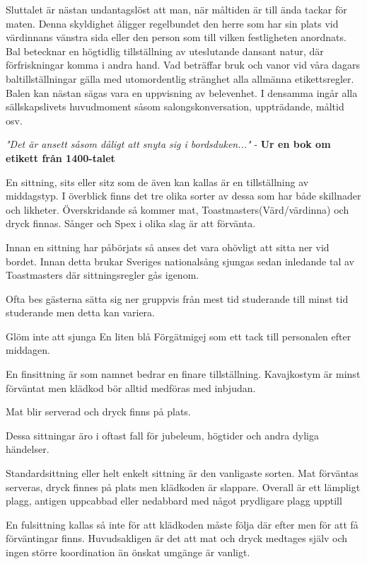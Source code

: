 Sluttalet är nästan undantagslöst att man, när måltiden är till ända tackar för maten. Denna skyldighet åligger regelbundet den herre som har sin plats vid värdinnans vänstra sida eller den person som till vilken festligheten anordnats.
\filbreak
{}
Bal betecknar en högtidlig tillställning av uteslutande dansant natur, där förfriskningar komma i andra hand. Vad beträffar bruk och vanor vid våra dagars baltillställningar gälla med utomordentlig stränghet alla allmänna etikettsregler. Balen kan nästan sägas vara en uppvisning av belevenhet. I densamma ingår alla sällskapslivets huvudmoment såsom salongskonversation, uppträdande, måltid osv.

\textit{"Det är ansett såsom dåligt att snyta sig i bordsduken..."} - \textbf{Ur en bok om etikett från 1400-talet}
\filbreak
{}

En sittning, sits eller sitz som de även kan kallas är en tillställning av middagstyp. I överblick finns det tre olika sorter av dessa som har både skillnader och likheter. Överskridande så kommer mat, Toastmasters(Värd/värdinna) och dryck finnas. Sånger och Spex i olika slag är att förvänta.

Innan en sittning har påbörjats så anses det vara ohövligt att sitta ner vid bordet. Innan detta brukar Sveriges nationalsång sjungas sedan inledande tal av Toastmasters där sittningsregler gås igenom.

Ofta bes gästerna sätta sig ner gruppvis från mest tid studerande till minst tid studerande men detta kan variera.

Glöm inte att sjunga En liten blå Förgätmigej som ett tack till personalen efter middagen.


En finsittning är som namnet bedrar en finare tillställning. Kavajkostym är minst förväntat men klädkod bör alltid medföras med inbjudan.

Mat blir serverad och dryck finns på plats.

Dessa sittningar äro i oftast fall för jubeleum, högtider och andra dyliga händelser.


Standardsittning eller helt enkelt sittning är den vanligaste sorten. Mat förväntas serveras, dryck finnes på plats men klädkoden är slappare. Overall är ett lämpligt plagg, antigen uppcabbad eller nedabbard med något prydligare plagg upptill


En fulsittning kallas så inte för att klädkoden måste följa där efter men för att få förväntingar finns. Huvudsakligen är det att mat och dryck medtages själv och ingen större koordination än önskat umgänge är vanligt.



\newpage